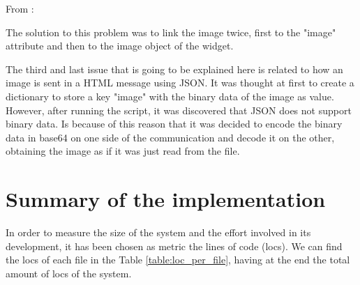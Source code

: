 From \cite{tkinter_images_double_ref}:


The solution to this problem was to link the image twice, first to the "image" attribute and then to the image object of the widget.

The third and last issue that is going to be explained here is related to how an image is sent in a HTML message using JSON. It was thought at first to create a dictionary to store a key "image" with the binary data of the image as value. However, after running the script, it was discovered that JSON does not support binary data. Is because of this reason that it was decided to encode the binary data in \gls{base64} on one side of the communication and decode it on the other, obtaining the image as if it was just read from the file.

\section{Summary of the implementation}
In order to measure the size of the system and the effort involved in its development, it has been chosen as metric the lines of code (\glspl{loc}). We can find the \glspl{loc} of each file in the Table \ref{table:loc_per_file}, having at the end the total amount of \glspl{loc} of the system.

